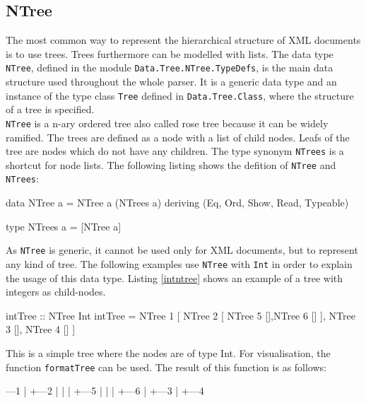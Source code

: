\documentclass[11pt,a4paper,headsepline, bibtotoc]{scrreprt}
\begin{document}
\subsection{NTree}\label{ntree}
The most common way to represent the hierarchical structure of XML documents is to use trees. Trees furthermore can be modelled with lists. The data type {\tt NTree}, defined in the module {\tt Data.Tree.NTree.TypeDefs}, is the main data structure used throughout the whole parser. It is a generic data type and an instance of the type class {\tt Tree} defined in {\tt Data.Tree.Class}, where the structure of a tree is specified.\\
{\tt NTree} is a n-ary ordered tree also called rose tree because it can be widely ramified. The trees are defined as a node with a list of child nodes. Leafs of the tree are nodes which do not have any children. The type synonym {\tt NTrees} is a shortcut for node lists. The following listing shows the defition of {\tt NTree} and {\tt NTrees}:
\begin{code}
data NTree a = NTree a (NTrees a)
    deriving
    (Eq, Ord, Show, Read, Typeable)

type NTrees a = [NTree a]
\end{code} 
As {\tt NTree} is generic, it cannot be used only for XML documents, but to represent any kind of tree. The following examples use {\tt NTree} with {\tt Int} in order to explain the usage of this data type. Listing \ref{intntree} shows an example of a tree with integers as child-nodes.
\begin{code}[caption={NTree with Int},label=intntree]
intTree :: NTree Int
intTree = NTree 1 [ NTree 2 [ NTree 5 [],NTree 6 []
                            ],
                    NTree 3 [],
                    NTree 4 []
                  ]
\end{code}
This is a simple tree where the nodes are of type Int. For visualisation, the function {\tt formatTree} can be used. The result of this function is as follows:
\begin{blank}
---1
   |
   +---2
   |   |
   |   +---5
   |   |
   |   +---6
   |
   +---3
   |
   +---4
\end{blank}
\end{document}
